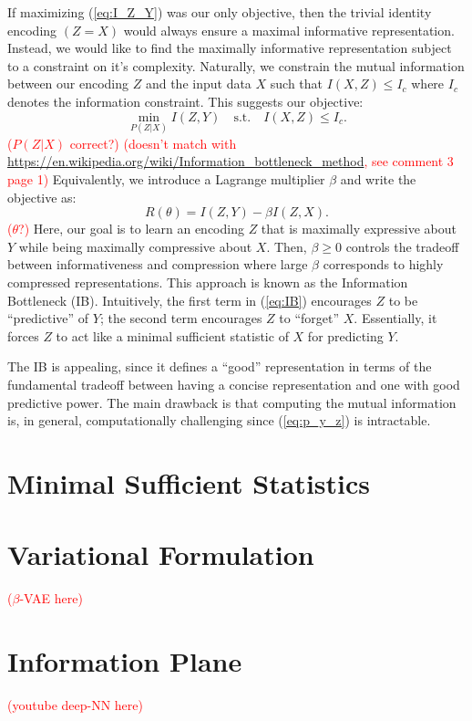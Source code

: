 \documentclass[11pt]{article}
\newcommand\myworries[1]{\textcolor{red}{(#1)}}
\begin{document}
If maximizing (\ref{eq:I_Z_Y}) was our only objective, then the trivial identity encoding $(Z = X)$ would always ensure a maximal informative representation. Instead, we would like to find the maximally informative representation subject to a constraint on it's complexity. Naturally, we constrain the mutual information between our encoding $Z$ and the input data $X$ such that $I(X,Z) \leq I_c$ where $I_c$ denotes the information constraint. This suggests our objective:
\begin{equation}
\underset{P(Z\vert X)}{\min} I(Z,Y) \quad\text{s.t.}\quad I(X,Z) \leq I_c.
\end{equation}
\myworries{$P(Z\vert X)$ correct?}
\myworries{doesn't match with \url{https://en.wikipedia.org/wiki/Information_bottleneck_method}, see comment 3 page 1}
Equivalently, we introduce a Lagrange multiplier $\beta$ and write the objective as:
\begin{equation}
R(\theta) = I(Z,Y) - \beta I(Z,X).
\label{eq:IB}
\end{equation}
\myworries{$\theta$?}
Here, our goal is to learn an encoding $Z$ that is maximally expressive about $Y$ while being maximally compressive about $X$. Then, $\beta\geq 0$ controls the tradeoff between informativeness and compression where large $\beta$ corresponds to highly compressed representations. This approach is known as the Information Bottleneck (IB). Intuitively, the first term in (\ref{eq:IB}) encourages $Z$ to be ``predictive'' of $Y$; the second term encourages $Z$ to ``forget'' $X$. Essentially, it forces $Z$ to act like a minimal sufficient statistic of $X$ for predicting $Y$.

The IB is appealing, since it defines a ``good'' representation in terms of the fundamental tradeoff between having a concise representation and one with good predictive power. The main drawback is that computing the mutual information is, in general, computationally challenging since (\ref{eq:p_y_z}) is intractable.

\section{Minimal Sufficient Statistics}

\section{Variational Formulation}


\myworries{$\beta$-VAE here}

\section{Information Plane}

\myworries{youtube deep-NN here}


 
\end{document}
